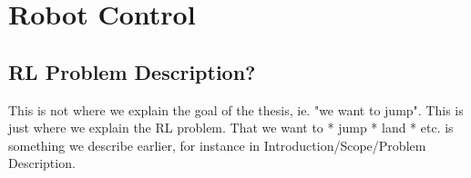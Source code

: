 \section{Robot Control}

\subsection{RL Problem Description?}
This is not where we explain the goal of the thesis, ie. "we want to jump". This is just where we explain the RL problem. That we want to 
* jump
* land
* etc. 
is something we describe earlier, for instance in Introduction/Scope/Problem Description. 